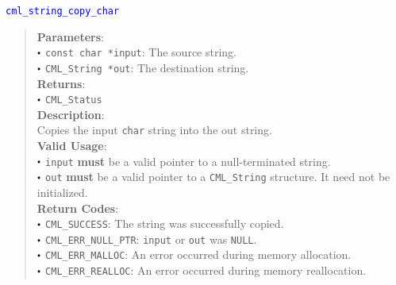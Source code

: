 \documentclass[a4paper,oneside,10pt]{article}
\newcommand{\function}[1]{
  \noindent\textcolor{blue}{\texttt{#1}}
  \vspace{-0.3em}
}
\renewcommand{\dot}{\raisebox{0.3ex}{\scalebox{0.6}{$\bullet$}}}
\theoremstyle{definition}
\begin{document}
\function{cml\_string\_copy\_char}
\begin{quote}
  \textbf{Parameters}: \\
  $\dot$ \texttt{const char *input}: The source string. \\
  $\dot$ \texttt{CML\_String *out}: The destination string. \\
  \textbf{Returns}: \\
  $\dot$ \texttt{CML\_Status} \\

  \vspace{-0.75em}
  \textbf{Description}: \\
  Copies the input \texttt{char} string into the out string. \\

  \vspace{-0.75em}
  \textbf{Valid Usage}: \\
  $\dot$ \texttt{input} \textbf{must} be a valid pointer to a null-terminated string. \\
  $\dot$ \texttt{out} \textbf{must} be a valid pointer to a \texttt{CML\_String} structure. It need not be initialized. \\

  \vspace{-0.75em}
  \textbf{Return Codes}: \\
  $\dot$ \texttt{CML\_SUCCESS}: The string was successfully copied. \\
  $\dot$ \texttt{CML\_ERR\_NULL\_PTR}: \texttt{input} or \texttt{out} was \texttt{NULL}. \\
  $\dot$ \texttt{CML\_ERR\_MALLOC}: An error occurred during memory allocation. \\
  $\dot$ \texttt{CML\_ERR\_REALLOC}: An error occurred during memory reallocation. \\
\end{quote}
\end{document}

